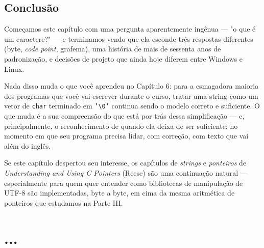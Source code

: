 \documentclass[12pt,a4paper,oneside]{extreport}
\begin{document}
\section*{Conclusão}

Começamos este capítulo com uma pergunta aparentemente ingênua — "o que é um caractere?" — e terminamos vendo que ela esconde três respostas diferentes (byte, \textit{code point}, grafema), uma história de mais de sessenta anos de padronização, e decisões de projeto que ainda hoje diferem entre Windows e Linux.

Nada disso muda o que você aprendeu no Capítulo 6: para a esmagadora maioria dos programas que você vai escrever durante o curso, tratar uma string como um vetor de \texttt{char} terminado em \texttt{'\textbackslash 0'} continua sendo o modelo correto e suficiente. O que muda é a sua compreensão do que está por trás dessa simplificação — e, principalmente, o reconhecimento de quando ela deixa de ser suficiente: no momento em que seu programa precisa lidar, com correção, com texto que vai além do inglês.

Se este capítulo despertou seu interesse, os capítulos de \textit{strings} e \textit{ponteiros} de \textit{Understanding and Using C Pointers} (Reese) são uma continuação natural — especialmente para quem quer entender como bibliotecas de manipulação de UTF-8 são implementadas, byte a byte, em cima da mesma aritmética de ponteiros que estudamos na Parte III.



\chapter*{...}
\end{document}
